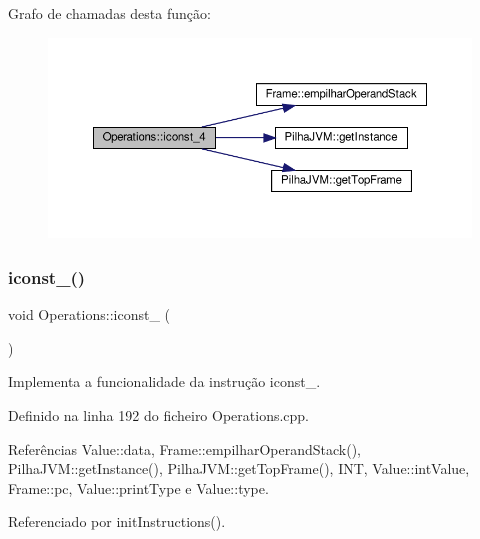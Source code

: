 Grafo de chamadas desta função\+:\nopagebreak
\begin{figure}[H]
\begin{center}
\leavevmode
\includegraphics[width=350pt]{classOperations_a5fad2dad3d79c889728a6687f36e1192_cgraph}
\end{center}
\end{figure}
\mbox{\label{classOperations_a87a4c7214825d084ded4a8ea50e4af7c}} 
\subsubsection{\texorpdfstring{iconst\+\_()}{iconst\_5()}}
{\footnotesize\ttfamily void Operations\+::iconst\+\_ (\begin{DoxyParamCaption}{ }\end{DoxyParamCaption})\hspace{0.3cm}{\ttfamily [private]}}



Implementa a funcionalidade da instrução iconst\+\_. 



Definido na linha 192 do ficheiro Operations.\+cpp.



Referências Value\+::data, Frame\+::empilhar\+Operand\+Stack(), Pilha\+J\+V\+M\+::get\+Instance(), Pilha\+J\+V\+M\+::get\+Top\+Frame(), I\+NT, Value\+::int\+Value, Frame\+::pc, Value\+::print\+Type e Value\+::type.



Referenciado por init\+Instructions().

